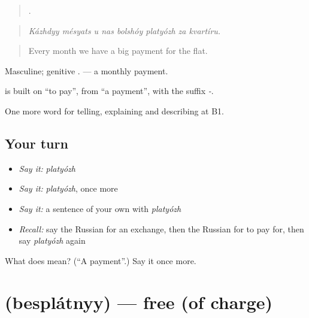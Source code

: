 \begin{quote}
       .
\end{quote}

\begin{quote}
\emph{Kázhdyy mésyats u nas bolshóy platyózh za kvartíru.}
\end{quote}

\begin{quote}
Every month we have a big payment for the flat.
\end{quote}

Masculine; genitive \emph{}. \emph{ } — a monthly payment.

\begin{cousinweb}
\textbf{} is built on \emph{} \textquotedblleft{}to pay\textquotedblright{}, from \emph{} \textquotedblleft{}a payment\textquotedblright{}, with the suffix \emph{-}.
\end{cousinweb}

\begin{grammarlens}[title={What you've built}]
One more word for telling, explaining and describing at B1.
\end{grammarlens}

\subsection*{Your turn}
\begin{itemize}
\raggedright
  \item \emph{Say it:} \emph{platyózh}
  \item \emph{Say it:} \emph{platyózh}, once more
  \item \emph{Say it:} a sentence of your own with \emph{platyózh}
  \item \emph{Recall:} say the Russian for an exchange, then the Russian for to pay for, then say \emph{platyózh} again
\end{itemize}

\begin{tcolorbox}[breakable,colback=teal!4,colframe=teal!35!black,title={Before you move on}]
What does  mean? (\textquotedblleft{}A payment\textquotedblright{}.) Say it once more.
\end{tcolorbox}
\section[\texorpdfstring{\ru{бесплатный} (besplátnyy)}{бесплатный (besplátnyy)}]{ (besplátnyy) — free (of charge)}

